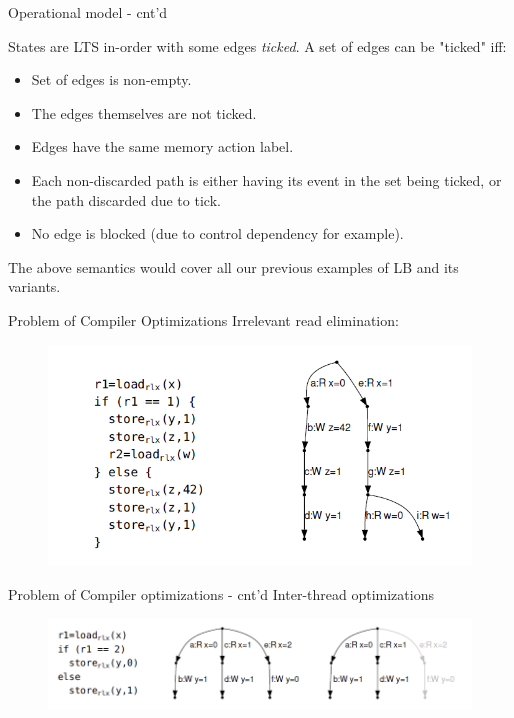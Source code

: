 \documentclass{beamer}
\begin{document}
    \begin{frame}{Operational model - cnt'd}
        
        States are LTS in-order with some edges \textit{ticked}.
        A set of edges can be "ticked" iff:
        \begin{itemize}
            \item Set of edges is non-empty.
            \item The edges themselves are not ticked.
            \item Edges have the same memory action label.
            \item Each non-discarded path is either having its event in the set being ticked, or the path discarded due to tick.
            \item No edge is blocked (due to control dependency for example).
        \end{itemize}
        
        \center The above semantics would cover all our previous examples of LB and its variants. 
    \end{frame}

    \begin{frame}{Problem of Compiler Optimizations}
        Irrelevant read elimination:
        \begin{figure}
            \centering
            \includegraphics[scale=0.7]{IRR-RD.PNG}
        \end{figure}
    \end{frame}

    \begin{frame}{Problem of Compiler optimizations - cnt'd}
        Inter-thread optimizations
        \begin{figure}
            \centering
            \includegraphics[scale=0.7]{INTER-THREAD-OPT.PNG}
        \end{figure}
    \end{frame}
\end{document}

